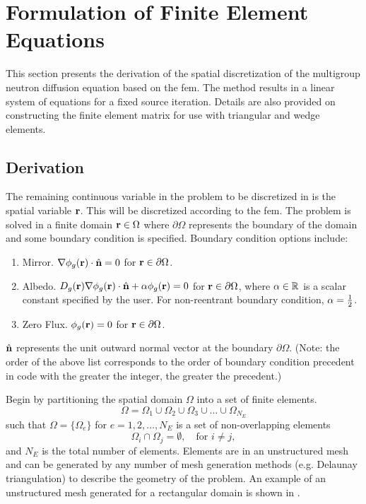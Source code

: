 \section{Formulation of Finite Element Equations}
  \label{sec:formulation}
  This section presents the derivation of the spatial discretization of the
  multigroup neutron diffusion equation based on the \gls{fem}. The method
  results in a linear system of equations for a fixed source iteration. Details
  are also provided on constructing the finite element matrix for use with
  triangular and wedge elements.

  \subsection{Derivation}
    \label{sec:formulation:derivation}
    The remaining continuous variable in the problem to be discretized in
     is the spatial variable $\mathbf{r}$. This will be 
    discretized according to the \gls{fem}. The problem is solved in a finite 
    domain $\mathbf{r} \in \Omega$ where $\partial \Omega$ represents the boundary of 
    the domain and some boundary condition is specified. Boundary condition 
    options include:
    \begin{enumerate}
      \item Mirror. $\mathbf{\nabla} \phi_g(\mathbf{r}) \cdot \hat{\mathbf{n}} = 0$ for 
        $\mathbf{r} \in \partial \Omega$.
      \item Albedo. $D_g(\mathbf{r}) \mathbf{\nabla} \phi_g(\mathbf{r}) \cdot \hat{\mathbf{n}} + 
        \alpha \phi_g(\mathbf{r})=0$ for $\mathbf{r} \in \partial \Omega$,
        where $\alpha \in \mathbb{R}$ is a scalar constant specified
        by the user. For non-reentrant boundary condition, $\alpha = \frac{1}{2}$.
      \item Zero Flux. $\phi_g(\mathbf{r}) = 0$ for $\mathbf{r} \in \partial \Omega$.
    \end{enumerate}
    $\hat{\mathbf{n}}$ represents the unit outward normal vector at the boundary $\partial
    \Omega$.
    (Note: the order of the above list corresponds to the order of boundary 
    condition precedent in code with the greater the integer, the greater the 
    precedent.)
    
    Begin by partitioning the spatial domain $\Omega$ into a set of finite 
    elements.
    \begin{equation}
      \label{eq:set_of_elements}
      \Omega = \Omega_1 \cup \Omega_2 \cup \Omega_3 \cup \ldots \cup
        \Omega_{N_E} 
    \end{equation}
    such that $\Omega = \{\Omega_e\}$ for $e = 1,2,\ldots,N_E$ is a set of
    non-overlapping elements 
    \begin{equation}
      \label{eq:non_overlapping}
      \Omega_i \cap \Omega_j = \emptyset, \quad \text{for } i \ne j,
    \end{equation}
    and $N_E$ is the total number of elements. Elements are in an unstructured
    mesh and can be generated by any number of mesh generation methods (e.g.
    Delaunay triangulation) to describe the geometry of the problem. An example
    of an unstructured mesh generated for a rectangular domain is shown in
    .

